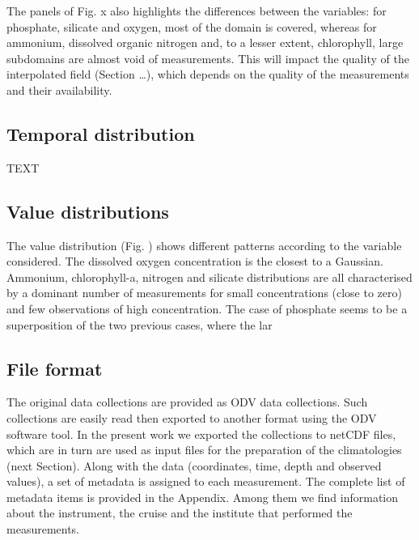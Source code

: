 \documentclass[essd, manuscript]{copernicus}
\begin{document}
The panels of Fig. x also highlights the differences between the variables: for phosphate, silicate and oxygen, most of the domain is covered, whereas for ammonium, dissolved organic nitrogen and, to a lesser extent, chlorophyll, large subdomains are almost void of measurements. This will impact the quality of the interpolated field (Section …), which depends on the quality of the measurements and their availability.











\subsection{Temporal distribution}
TEXT

\subsection{Value distributions}

The value distribution (Fig. ) shows different patterns according to the variable considered. The dissolved oxygen concentration is the closest to a Gaussian. Ammonium, chlorophyll-a, nitrogen and silicate distributions are all characterised by a dominant number of measurements for small concentrations (close to zero) and few observations of high concentration. The case of phosphate seems to be a superposition of the two previous cases, where the lar







\subsection{File format}
The original data collections are provided as ODV \citep[Ocean Data View,][]{SCHLITZER2002} data collections. Such collections are easily read then exported to another format using the ODV software tool. In the present work we exported the collections to netCDF files, which are in turn are used as input files for the preparation of the climatologies (next Section). 
Along with the data (coordinates, time, depth and observed values), a set of metadata is assigned to each measurement. The complete list of metadata items is provided in the Appendix. Among them we find information about the instrument, the cruise and the institute that performed the measurements. 
\end{document}
